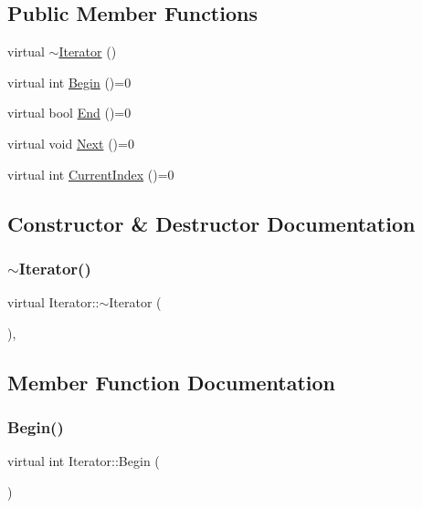 \subsection*{Public Member Functions}
\begin{DoxyCompactItemize}
\item 
virtual \mbox{\hyperlink{class_iterator_a0734562e2e7656cef942384a80be702f}{$\sim$\+Iterator}} ()
\item 
virtual int \mbox{\hyperlink{class_iterator_aceb0c4d549106fab9b8d6ba9965f0d6f}{Begin}} ()=0
\item 
virtual bool \mbox{\hyperlink{class_iterator_a7cebd24c11b2f4577f72e228f849d092}{End}} ()=0
\item 
virtual void \mbox{\hyperlink{class_iterator_a124e522942b3a5f058ad9091fe74c283}{Next}} ()=0
\item 
virtual int \mbox{\hyperlink{class_iterator_a5254a8ede30314e572c5f35e3a7f8e8c}{Current\+Index}} ()=0
\end{DoxyCompactItemize}


\subsection{Constructor \& Destructor Documentation}
\mbox{\label{class_iterator_a0734562e2e7656cef942384a80be702f}} 
\subsubsection{\texorpdfstring{$\sim$Iterator()}{~Iterator()}}
{\footnotesize\ttfamily virtual Iterator\+::$\sim$\+Iterator (\begin{DoxyParamCaption}{ }\end{DoxyParamCaption})\hspace{0.3cm}{\ttfamily [inline]}, {\ttfamily [virtual]}}



\subsection{Member Function Documentation}
\mbox{\label{class_iterator_aceb0c4d549106fab9b8d6ba9965f0d6f}} 
\subsubsection{\texorpdfstring{Begin()}{Begin()}}
{\footnotesize\ttfamily virtual int Iterator\+::\+Begin (\begin{DoxyParamCaption}{ }\end{DoxyParamCaption})\hspace{0.3cm}{\ttfamily [pure virtual]}}



